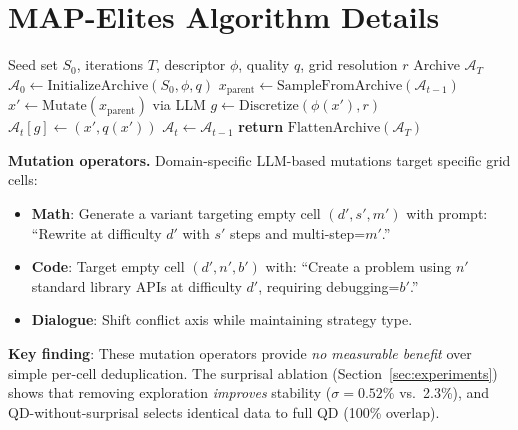 \documentclass{article}
\theoremstyle{plain}
\theoremstyle{remark}
\begin{document}
{\small


}



\appendix


\section{MAP-Elites Algorithm Details}
\label{sec:app_algorithm}

\begin{algorithm}[h]
\caption{MAP-Elites with mutation operators (full version)}
\label{alg:qd_synth_full}
\begin{algorithmic}[1]
\REQUIRE Seed set $S_0$, iterations $T$, descriptor $\phi$, quality $q$, grid resolution $r$
\ENSURE Archive $\mathcal{A}_T$
\STATE $\mathcal{A}_0 \leftarrow \text{InitializeArchive}(S_0, \phi, q)$
  \STATE $x_{\text{parent}} \leftarrow \text{SampleFromArchive}(\mathcal{A}_{t-1})$
  \STATE $x' \leftarrow \text{Mutate}(x_{\text{parent}})$ via LLM
  \STATE $g \leftarrow \text{Discretize}(\phi(x'), r)$
    \STATE $\mathcal{A}_t[g] \leftarrow (x', q(x'))$
  \ELSE
    \STATE $\mathcal{A}_t \leftarrow \mathcal{A}_{t-1}$
  \ENDIF
\ENDFOR
\STATE \textbf{return} $\text{FlattenArchive}(\mathcal{A}_T)$
\end{algorithmic}
\end{algorithm}

\textbf{Mutation operators.}
Domain-specific LLM-based mutations target specific grid cells:
\begin{itemize}[nosep]
  \item \textbf{Math}: Generate a variant targeting empty cell $(d', s', m')$ with prompt: ``Rewrite at difficulty $d'$ with $s'$ steps and multi-step=$m'$.''
  \item \textbf{Code}: Target empty cell $(d', n', b')$ with: ``Create a problem using $n'$ standard library APIs at difficulty $d'$, requiring debugging=$b'$.''
  \item \textbf{Dialogue}: Shift conflict axis while maintaining strategy type.
\end{itemize}

\noindent\textbf{Key finding}: These mutation operators provide \emph{no measurable benefit} over simple per-cell deduplication. The surprisal ablation (Section~\ref{sec:experiments}) shows that removing exploration \emph{improves} stability ($\sigma{=}0.52\%$ vs.\ 2.3\%), and QD-without-surprisal selects identical data to full QD (100\% overlap).
\end{document}
